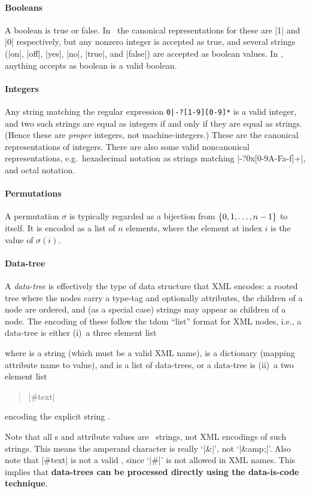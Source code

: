 \documentclass{mtmtcl}
\theoremstyle{plain}
\theoremstyle{remark}
\begin{document}
\paragraph{Booleans}
A boolean is true or false. In \Tcl\ the canonical representations 
for these are |1| and |0| respectively, but any nonzero integer is 
accepted as true, and several strings (|on|, |off|, |yes|, |no|, 
|true|, and |false|) are accepted as boolean values. In \mtl, 
anything  accepts as boolean 
is a valid boolean.

\paragraph{Integers}
Any string matching the regular expression \verb"0|-?[1-9][0-9]*" is 
a valid integer, and two such strings are equal as integers if and 
only if they are equal as strings. (Hence these are \emph{proper} 
integers, not machine-integers.) These are the canonical 
representations of integers. There are also some valid noncanonical 
representations, e.g.~hexadecimal notation as strings matching 
|-?0x[0-9A-Fa-f]+|, and octal notation.

\paragraph{Permutations}
A permutation $\sigma$ is typically regarded as a bijection from 
$\{0,1,\dotsc, n-\nobreak1\}$ to itself. It is encoded as a list of 
$n$ elements, where the element at index $i$ is the value of 
$\sigma(i)$.

\paragraph{Data-tree}
A \emph{data-tree} is effectively the type of data structure that 
XML encodes: a rooted tree where the nodes carry a type-tag and 
optionally attributes, the children of a node are ordered, and (as a 
special case) strings may appear as children of a node. The encoding 
of these follow the \textsf{tdom} ``list'' format for XML nodes, 
i.e., a data-tree is either (i)~a three element list
\begin{quote}
    
\end{quote}
where  is a string (which must be a valid XML name), 
 is a dictionary (mapping attribute name to value), 
and  is a list of data-trees, or a data-tree is (ii)~a 
two element list
\begin{quote}
  |#text| 
\end{quote}
encoding the explicit string .

Note that all s and attribute values are \Tcl\ strings, 
not XML encodings of such strings. This means the amperand character 
is really `|&|', not `|&amp;|'. Also note that |#text| is not a valid 
, since `|#|' is not allowed in XML names. This implies 
that \textbf{data-trees can be processed directly using the 
data-is-code technique}.



\PrintIndex
\end{document}

